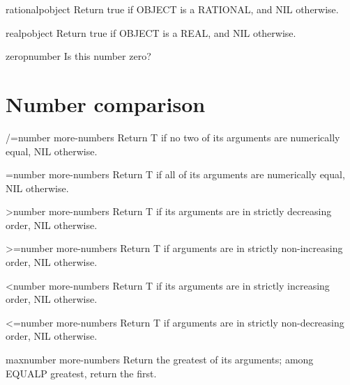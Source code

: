 \begin{function}{rationalp}{object}{}{}
  Return true if OBJECT is a RATIONAL, and NIL otherwise.
\end{function}

\begin{function}{realp}{object}{}{}
  Return true if OBJECT is a REAL, and NIL otherwise.
\end{function}

\begin{function}{zerop}{number}{}{}
  Is this number zero?
\end{function}

\section{Number comparison}
\label{sec:number-comparison}

\begin{function}{/=}{number \rest more-numbers}{}{}
  Return T if no two of its arguments are numerically equal, NIL otherwise.
\end{function}

\begin{function}{=}{number \rest more-numbers}{}{}
  Return T if all of its arguments are numerically equal, NIL otherwise.
\end{function}

\begin{function}{>}{number \rest more-numbers}{}{}
  Return T if its arguments are in strictly decreasing order, NIL otherwise.
\end{function}

\begin{function}{>=}{number \rest more-numbers}{}{}
  Return T if arguments are in strictly non-increasing order, NIL otherwise.
\end{function}

\begin{function}{<}{number \rest more-numbers}{}{}
  Return T if its arguments are in strictly increasing order, NIL otherwise.
\end{function}

\begin{function}{<=}{number \rest more-numbers}{}{}
  Return T if arguments are in strictly non-decreasing order, NIL otherwise.
\end{function}

\begin{function}{max}{number \rest more-numbers}{}{}
  Return the greatest of its arguments; among EQUALP greatest, return
the first.
\end{function}

